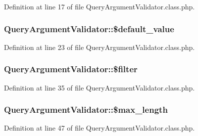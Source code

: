 Definition at line 17 of file Query\+Argument\+Validator.\+class.\+php.

\hypertarget{classQueryArgumentValidator_ae61c68b0a9cd40caa31c464ffddf4ffa}{}
\subsubsection[{\$default\+\_\+value}]{\setlength{\rightskip}{0pt plus 5cm}Query\+Argument\+Validator\+::\$default\+\_\+value}\label{classQueryArgumentValidator_ae61c68b0a9cd40caa31c464ffddf4ffa}


Definition at line 23 of file Query\+Argument\+Validator.\+class.\+php.

\hypertarget{classQueryArgumentValidator_a43b0653e37185f392daf500c50484186}{}
\subsubsection[{\$filter}]{\setlength{\rightskip}{0pt plus 5cm}Query\+Argument\+Validator\+::\$filter}\label{classQueryArgumentValidator_a43b0653e37185f392daf500c50484186}


Definition at line 35 of file Query\+Argument\+Validator.\+class.\+php.

\hypertarget{classQueryArgumentValidator_a6c99b1e774c49ebe4cbb5f8671156654}{}
\subsubsection[{\$max\+\_\+length}]{\setlength{\rightskip}{0pt plus 5cm}Query\+Argument\+Validator\+::\$max\+\_\+length}\label{classQueryArgumentValidator_a6c99b1e774c49ebe4cbb5f8671156654}


Definition at line 47 of file Query\+Argument\+Validator.\+class.\+php.

\hypertarget{classQueryArgumentValidator_a5553903c3bdf620408196db924a918c0}{}
